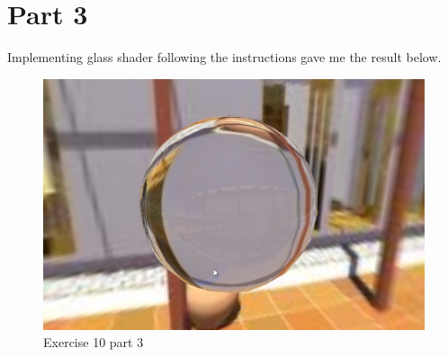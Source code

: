 \section{Part 3}
Implementing glass shader following the instructions gave me the result
below.
\begin{figure}[ht!]
	\begin{center}
		\includegraphics[width=1.0\textwidth]{figures/exercise_10_2}
	\end{center}
	\vspace{-4.5ex}\caption{Exercise 10 part 3}
	\label{fig:exercise_10_2} 
\end{figure}

